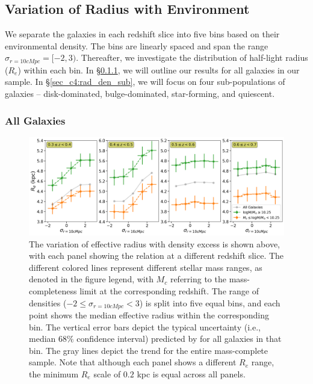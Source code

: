 \subsection{Variation of Radius with Environment} \label{sec_c4:rad_den}
We separate the galaxies in each redshift slice into five bins based on their environmental density. The bins are linearly spaced and span the range $\sigma_{r=10cMpc} = [-2,3)$. Thereafter, we investigate the distribution of half-light radius ($R_e$) within each bin. In \S \ref{sec_c4:rad_den_all}, we will outline our results for all galaxies in our sample. In \S \ref{sec_c4:rad_den_sub}, we will focus on four sub-populations of galaxies -- disk-dominated, bulge-dominated, star-forming, and quiescent. 

\subsubsection{All Galaxies} \label{sec_c4:rad_den_all}
\begin{figure}[htb]
    \centering
    \includegraphics[width = \textwidth]{rad_den_all.png}
    \caption{The variation of effective radius with density excess is shown above, with each panel showing the relation at a different redshift slice. The different colored lines represent different stellar mass ranges, as denoted in the figure legend, with $M_c$ referring to the mass-completeness limit at the corresponding redshift. The range of densities ($-2 \leq \sigma_{r=10cMpc} < 3$) is split into five equal bins, and each point  shows the median effective radius within the corresponding bin. The vertical error bars depict the typical uncertainty (i.e., median $68\%$ confidence interval) predicted by \gampen{} for all galaxies in that bin. The gray lines depict the trend for the entire mass-complete sample. Note that although each panel shows a different $R_e$ range, the minimum $R_e$ scale of $0.2$ kpc is equal across all panels.}
    \label{fig_c4:rad_den_all}
\end{figure}


